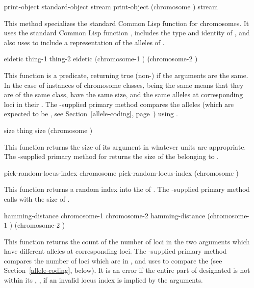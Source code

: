 {\filbreak
{\samepage
\Eggeneric print-object {standard-object stream}
 print-object {(chromosome ) stream}

This method specializes the standard Common Lisp  function for
chromosomes. It uses the standard Common Lisp function ,
includes the type and identity of , and also uses
 to include a representation of the alleles of
.
\par}%

\filbreak
{\samepage
\Defgeneric eidetic {thing-1 thing-2}
 eidetic {(chromosome-1 ) (chromosome-2 )}

This function is a predicate, returning true (non-) if the arguments are the
same. In the case of instances of chromosome classes, being the same means that they
are of the same class, have the same size, and the same alleles at corresponding
loci in their . The \geco-supplied primary method compares the
alleles (which are expected to be , see 
Section~\ref{allele-coding}, page~\pageref{allele-coding}) using .
\par}%

\filbreak
{\samepage
\Defgeneric size {thing}
 size {(chromosome )}

This function returns the size of its argument in whatever units are appropriate. The
\geco-supplied primary method for  returns the size of the
 belonging to .
\par}%

\filbreak
{\samepage
\Defgeneric pick-random-locus-index {chromosome}
 pick-random-locus-index {(chromosome )}

This function returns a random index into the  of
. The \geco-supplied primary method calls
 with the size of .
\par}%

\filbreak
{\samepage
\Defgeneric hamming-distance {chromosome-1 chromosome-2}
 hamming-distance {(chromosome-1 ) (chromosome-2 )}

This function returns the count of the number of loci in the two arguments
which have different alleles at corresponding loci. The \geco-supplied
primary method compares the number of loci which are in ,
and uses  to compare the  (see
Section~\ref{allele-coding}, below). It is an error
if the entire part of  designated is not within its
, \ie, if an invalid locus index is implied by the
arguments.
\par}%


}
